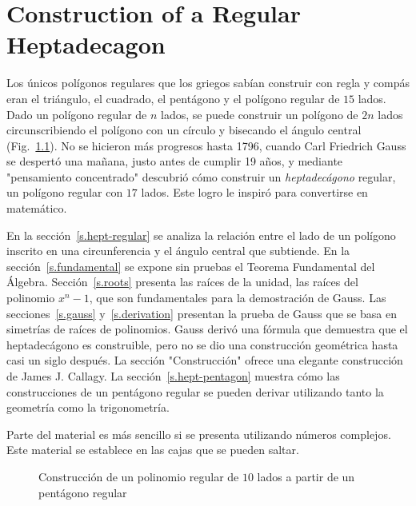 
\chapter{Construction of a Regular Heptadecagon}\label{c.heptadecagon}


Los únicos polígonos regulares que los griegos sabían construir con regla y compás eran el triángulo, el cuadrado, el pentágono y el polígono regular de $15$ lados. Dado un polígono regular de $n$ lados, se puede construir un polígono de $2n$ lados circunscribiendo el polígono con un círculo y bisecando el ángulo central (Fig.~\ref{f.hept-double}). No se hicieron más progresos hasta 1796, cuando Carl Friedrich Gauss se despertó una mañana, justo antes de cumplir 19 años, y mediante "pensamiento concentrado" descubrió cómo construir un \emph{heptadecágono} regular, un polígono regular con $17$ lados. Este logro le inspiró para convertirse en matemático.

En la sección~\ref{s.hept-regular} se analiza la relación entre el lado de un polígono inscrito en una circunferencia y el ángulo central que subtiende. En la sección~\ref{s.fundamental} se expone sin pruebas el Teorema Fundamental del Álgebra. Sección~\ref{s.roots} presenta las raíces de la unidad, las raíces del polinomio $x^n-1$, que son fundamentales para la demostración de Gauss. Las secciones~\ref{s.gauss} y~\ref{s.derivation} presentan la prueba de Gauss que se basa en simetrías de raíces de polinomios. Gauss derivó una fórmula que demuestra que el heptadecágono es construible, pero no se dio una construcción geométrica hasta casi un siglo después. La sección "Construcción" ofrece una elegante construcción de James J. Callagy. La sección~\ref{s.hept-pentagon} muestra cómo las construcciones de un pentágono regular se pueden derivar utilizando tanto la geometría como la trigonometría.

Parte del material es más sencillo si se presenta utilizando números complejos. Este material se establece en las cajas que se pueden saltar.
\begin{figure}[b]
\begin{center}
\end{center}
\caption{Construcción de un polinomio regular de $10$ lados a partir de un pentágono regular}\label{f.hept-double}
\end{figure}

